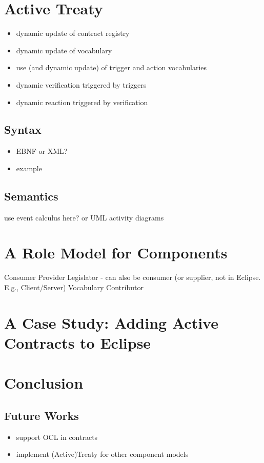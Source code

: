 \documentclass{llncs}
\begin{document}
\section{Active Treaty}

\begin{itemize}
  \item dynamic update of contract registry
  \item dynamic update of vocabulary
  \item use (and dynamic update) of trigger and action vocabularies
  \item dynamic verification triggered by triggers
  \item dynamic reaction triggered by verification
\end{itemize}


\subsection{Syntax}

\begin{itemize}
\item EBNF or XML?
\item example
\end{itemize}


\subsection{Semantics}

use event calculus here? or UML activity diagrams



\section{A Role Model for Components}

Consumer
Provider
Legislator - can also be consumer (or supplier, not in Eclipse. E.g., Client/Server)
Vocabulary Contributor



\section{A Case Study: Adding Active Contracts to Eclipse}



\section{Conclusion}


\subsection{Future Works}

\begin{itemize}
	\item support OCL in contracts
	\item implement (Active)Treaty for other component models
\end{itemize}



  
    
\end{document}
